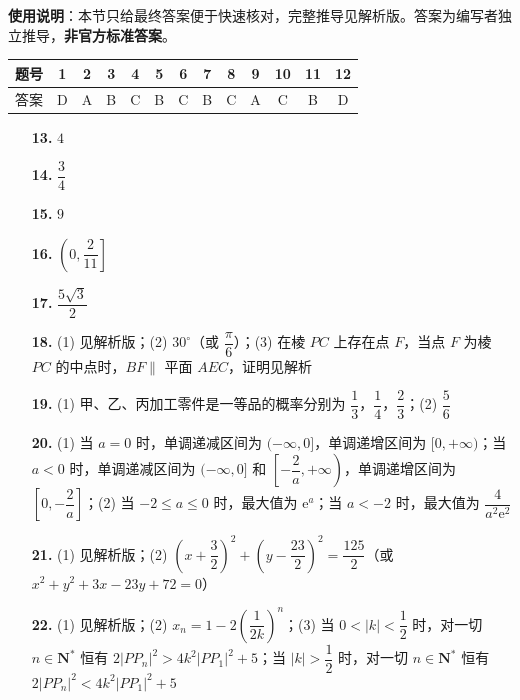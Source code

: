 
\begin{gknotice}
\textbf{使用说明}：本节只给最终答案便于快速核对，完整推导见解析版。答案为编写者独立推导，\textbf{非官方标准答案}。
\end{gknotice}

\begin{center}\begin{tabular}{ccccccccccccc}
\toprule
题号 & 1 & 2 & 3 & 4 & 5 & 6 & 7 & 8 & 9 & 10 & 11 & 12 \\
\midrule
答案 & D & A & B & C & B & C & B & C & A & C & B & D \\
\bottomrule
\end{tabular}\end{center}

\begin{itemize}[leftmargin=2.6em]
  \item[\textbf{13.}] $4$
  \item[\textbf{14.}] $\dfrac{3}{4}$
  \item[\textbf{15.}] $9$
  \item[\textbf{16.}] $\left(0, \dfrac{2}{11}\right]$
\end{itemize}

\begin{itemize}[leftmargin=2.6em]
  \item[\textbf{17.}] $\dfrac{5\sqrt{3}}{2}$
  \item[\textbf{18.}] (1) 见解析版；(2) $30^\circ$（或 $\dfrac{\pi}{6}$）；(3) 在棱 $PC$ 上存在点 $F$，当点 $F$ 为棱 $PC$ 的中点时，$BF \parallel$ 平面 $AEC$，证明见解析
  \item[\textbf{19.}] (1) 甲、乙、丙加工零件是一等品的概率分别为 $\dfrac{1}{3}$，$\dfrac{1}{4}$，$\dfrac{2}{3}$；(2) $\dfrac{5}{6}$
  \item[\textbf{20.}] (1) 当 $a = 0$ 时，单调递减区间为 $(-\infty, 0]$，单调递增区间为 $[0, +\infty)$；当 $a < 0$ 时，单调递减区间为 $(-\infty, 0]$ 和 $\left[-\dfrac{2}{a}, +\infty\right)$，单调递增区间为 $\left[0, -\dfrac{2}{a}\right]$；(2) 当 $-2 \leqslant a \leqslant 0$ 时，最大值为 $\mathrm{e}^a$；当 $a < -2$ 时，最大值为 $\dfrac{4}{a^2 \mathrm{e}^2}$
  \item[\textbf{21.}] (1) 见解析版；(2) $\left(x + \dfrac{3}{2}\right)^2 + \left(y - \dfrac{23}{2}\right)^2 = \dfrac{125}{2}$（或 $x^2 + y^2 + 3x - 23y + 72 = 0$）
  \item[\textbf{22.}] (1) 见解析版；(2) $x_n = 1 - 2\left(\dfrac{1}{2k}\right)^n$；(3) 当 $0 < |k| < \dfrac{1}{2}$ 时，对一切 $n \in \mathbf{N}^*$ 恒有 $2|PP_n|^2 > 4k^2|PP_1|^2 + 5$；当 $|k| > \dfrac{1}{2}$ 时，对一切 $n \in \mathbf{N}^*$ 恒有 $2|PP_n|^2 < 4k^2|PP_1|^2 + 5$
\end{itemize}
